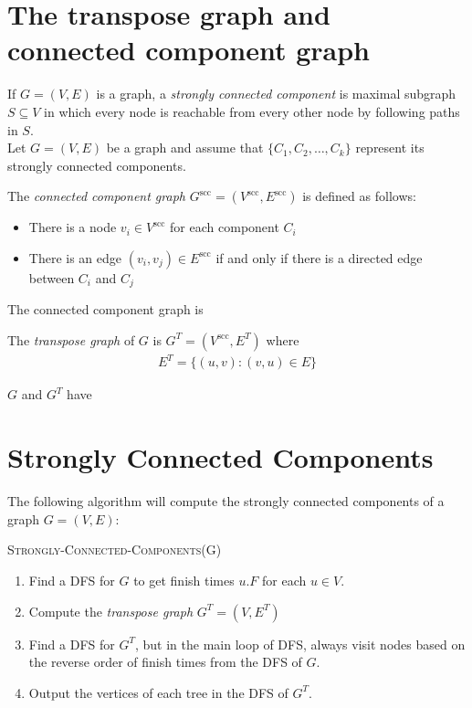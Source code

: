 \documentclass[11  pt]{exam}
\begin{document}
	
	
	\section{The transpose graph and connected component graph}
	If $G = (V,E)$ is a graph, a \emph{strongly connected component} is maximal subgraph $S \subseteq V$ in which every node is reachable from every other node by following paths in $S$. \\
	
	Let $G = (V,E)$ be a graph and assume that $\{C_1, C_2, \hdots , C_k\}$ represent its strongly connected components. 
	
	The \emph{connected component graph} $G^\text{scc} = (V^\text{scc}, E^\text{scc})$ is defined as follows:
	\begin{itemize}
		\item There is a node $v_i \in V^{\text{scc}}$ for each component $C_i$
		\item There is an edge $(v_i, v_j) \in E^{\text{scc}}$ if and only if there is a directed edge between $C_i$ and $C_j$
	\end{itemize}
	\begin{lemma}
		The connected component graph is 
	\end{lemma}
	
	\vs{5cm}
	
	The \emph{transpose graph} of $G$ is $G^T = (V^\text{scc}, E^T)$ where
	\begin{align*}
		E^T = \{ (u,v) \colon (v,u) \in E\}
	\end{align*}
	
	\begin{lemma}
		$G$ and $G^T$ have \hide{the same strongly }
	\end{lemma}
	
	\newpage
	
	
	
	
	
	\section{Strongly Connected Components}
	The following algorithm will compute the strongly connected components of a graph $G = (V,E)$:
	
	\textsc{Strongly-Connected-Components}(G)
	\begin{enumerate}
		\item Find a DFS for $G$ to get finish times $u.F$ for each $u \in V$.
		\item Compute the \emph{transpose graph} $G^T = (V,E^T)$
		\item Find a DFS for $G^T$, but in the main loop of DFS, always visit nodes based on the reverse order of finish times from the DFS of $G$.
		\item Output the vertices of each tree in the DFS of $G^T$. 
	\end{enumerate}
	\newpage
\end{document}
